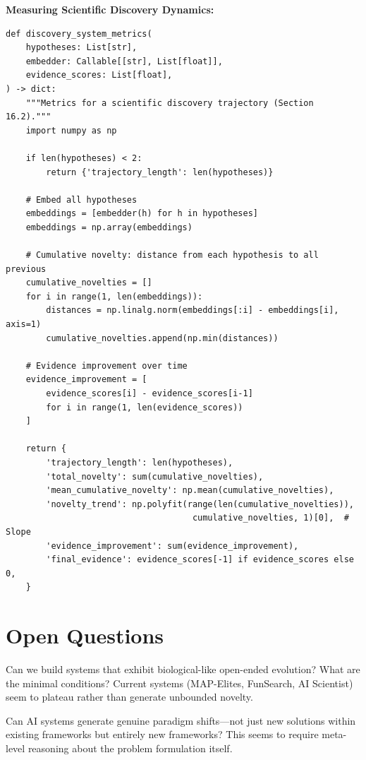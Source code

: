 \textbf{Measuring Scientific Discovery Dynamics:}

\begin{verbatim}
def discovery_system_metrics(
    hypotheses: List[str],
    embedder: Callable[[str], List[float]],
    evidence_scores: List[float],
) -> dict:
    """Metrics for a scientific discovery trajectory (Section 16.2)."""
    import numpy as np

    if len(hypotheses) < 2:
        return {'trajectory_length': len(hypotheses)}

    # Embed all hypotheses
    embeddings = [embedder(h) for h in hypotheses]
    embeddings = np.array(embeddings)

    # Cumulative novelty: distance from each hypothesis to all previous
    cumulative_novelties = []
    for i in range(1, len(embeddings)):
        distances = np.linalg.norm(embeddings[:i] - embeddings[i], axis=1)
        cumulative_novelties.append(np.min(distances))

    # Evidence improvement over time
    evidence_improvement = [
        evidence_scores[i] - evidence_scores[i-1]
        for i in range(1, len(evidence_scores))
    ]

    return {
        'trajectory_length': len(hypotheses),
        'total_novelty': sum(cumulative_novelties),
        'mean_cumulative_novelty': np.mean(cumulative_novelties),
        'novelty_trend': np.polyfit(range(len(cumulative_novelties)),
                                     cumulative_novelties, 1)[0],  # Slope
        'evidence_improvement': sum(evidence_improvement),
        'final_evidence': evidence_scores[-1] if evidence_scores else 0,
    }
\end{verbatim}



\section{Open Questions}

\begin{question}
Can we build systems that exhibit biological-like open-ended evolution? What are the minimal conditions? Current systems (MAP-Elites, FunSearch, AI Scientist) seem to plateau rather than generate unbounded novelty.
\end{question}

\begin{question}
Can AI systems generate genuine paradigm shifts---not just new solutions within existing frameworks but entirely new frameworks? This seems to require meta-level reasoning about the problem formulation itself.
\end{question}

